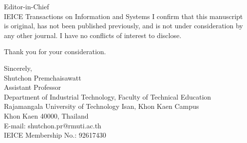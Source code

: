\documentclass[11pt]{letter}
\begin{document}
\begin{letter}{%
Editor-in-Chief\\
IEICE Transactions on Information and Systems
}
I confirm that this manuscript is original, has not been published
previously, and is not under consideration by any other journal. I
have no conflicts of interest to disclose.

Thank you for your consideration.

\closing{Sincerely,\\[12pt]
Shutchon Premchaisawatt\\
Assistant Professor\\
Department of Industrial Technology, Faculty of Technical Education\\
Rajamangala University of Technology Isan, Khon Kaen Campus\\
Khon Kaen 40000, Thailand\\
E-mail: shutchon.pr@rmuti.ac.th\\
IEICE Membership No.: 92617430}

\end{letter}
\end{document}
